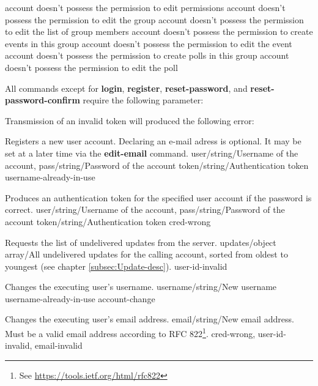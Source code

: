 \documentclass[parskip=full,11pt]{scrartcl}
\begin{document}
{account doesn't possess the permission to edit permissions}
{account doesn't possess the permission to edit the group}
{account doesn't possess the permission to edit the list of group members}
{account doesn't possess the permission to create events in this group}
{account doesn't possess the permission to edit the event}
{account doesn't possess the permission to create polls in this group}
{account doesn't possess the permission to edit the poll}

All commands except for \textbf{login}, \textbf{register},
\textbf{reset-password}, and \textbf{reset-password-confirm} require the
following parameter:\\
\par Transmission of an invalid token will produced the following error:\\

{Registers a new user account.
Declaring an e-mail adress is optional.
It may be set at a later time via the \textbf{edit-email} command.}
{user/string/Username of the account,
pass/string/Password of the account}
{token/string/Authentication token}
{username-already-in-use}
{}

{Produces an authentication token for the specified user account if the
password is correct.}
{user/string/Username of the account,
pass/string/Password of the account}
{token/string/Authentication token}
{cred-wrong}
{}

{Requests the list of undelivered updates from the server.}
{}
{updates/object array/All undelivered updates for the calling account{,} sorted
from oldest to youngest (see chapter \ref{subsec:Update-desc}).}
{user-id-invalid}
{}

{Changes the executing user's username.}
{username/string/New username}
{}
{username-already-in-use}
{account-change}

{Changes the executing user's email address.}
{email/string/New email address.
Must be a valid email address according to
RFC 822\footnote{See \url{https://tools.ietf.org/html/rfc822}}.}
{}
{cred-wrong, user-id-invalid, email-invalid}
{}
\end{document}
